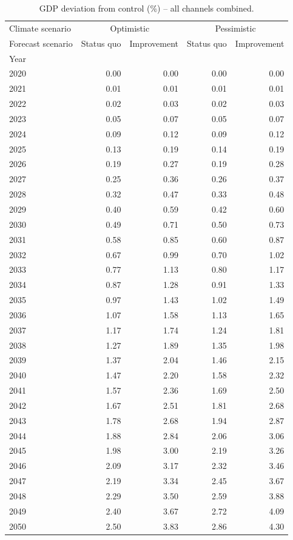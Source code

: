 \begin{table}
\caption{GDP deviation from control (\%) -- all channels combined.}
\label{tab:results_All_control_rel}
\centering
\begin{tabular}{lrrrr}
\toprule
Climate scenario & \multicolumn{2}{c}{Optimistic} & \multicolumn{2}{c}{Pessimistic} \\
Forecast scenario & Status quo & Improvement & Status quo & Improvement \\
Year &  &  &  &  \\
\midrule
2020 & 0.00 & 0.00 & 0.00 & 0.00 \\
2021 & 0.01 & 0.01 & 0.01 & 0.01 \\
2022 & 0.02 & 0.03 & 0.02 & 0.03 \\
2023 & 0.05 & 0.07 & 0.05 & 0.07 \\
2024 & 0.09 & 0.12 & 0.09 & 0.12 \\
2025 & 0.13 & 0.19 & 0.14 & 0.19 \\
2026 & 0.19 & 0.27 & 0.19 & 0.28 \\
2027 & 0.25 & 0.36 & 0.26 & 0.37 \\
2028 & 0.32 & 0.47 & 0.33 & 0.48 \\
2029 & 0.40 & 0.59 & 0.42 & 0.60 \\
2030 & 0.49 & 0.71 & 0.50 & 0.73 \\
2031 & 0.58 & 0.85 & 0.60 & 0.87 \\
2032 & 0.67 & 0.99 & 0.70 & 1.02 \\
2033 & 0.77 & 1.13 & 0.80 & 1.17 \\
2034 & 0.87 & 1.28 & 0.91 & 1.33 \\
2035 & 0.97 & 1.43 & 1.02 & 1.49 \\
2036 & 1.07 & 1.58 & 1.13 & 1.65 \\
2037 & 1.17 & 1.74 & 1.24 & 1.81 \\
2038 & 1.27 & 1.89 & 1.35 & 1.98 \\
2039 & 1.37 & 2.04 & 1.46 & 2.15 \\
2040 & 1.47 & 2.20 & 1.58 & 2.32 \\
2041 & 1.57 & 2.36 & 1.69 & 2.50 \\
2042 & 1.67 & 2.51 & 1.81 & 2.68 \\
2043 & 1.78 & 2.68 & 1.94 & 2.87 \\
2044 & 1.88 & 2.84 & 2.06 & 3.06 \\
2045 & 1.98 & 3.00 & 2.19 & 3.26 \\
2046 & 2.09 & 3.17 & 2.32 & 3.46 \\
2047 & 2.19 & 3.34 & 2.45 & 3.67 \\
2048 & 2.29 & 3.50 & 2.59 & 3.88 \\
2049 & 2.40 & 3.67 & 2.72 & 4.09 \\
2050 & 2.50 & 3.83 & 2.86 & 4.30 \\
\bottomrule
\end{tabular}
\end{table}
